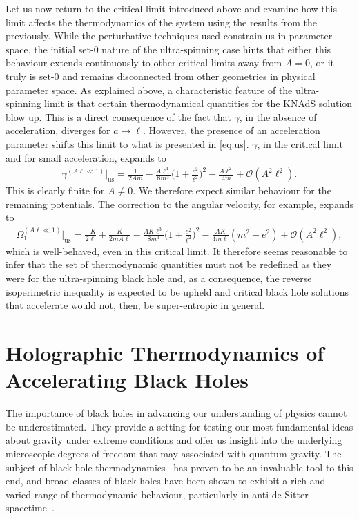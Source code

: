 \documentclass[
twoside,
openright,
frontopenright,
]{dmathesis}
\begin{document}
Let us now return to the critical limit introduced above and examine how this
limit affects the thermodynamics of the system using the results from the
previously. While the perturbative techniques used constrain us in parameter
space, the initial set-0 nature of the ultra-spinning case hints that either
this behaviour extends continuously to other critical limits away from $A=0$, or
it truly is set-0 and remains disconnected from other geometries in physical
parameter space. As explained above, a characteristic feature of the
ultra-spinning limit is that certain thermodynamical quantities for the KNAdS
solution blow up. This is a direct consequence of the fact that $\gamma$, in the
absence of acceleration, diverges for $a\to\ell$. However, the presence of an
acceleration parameter shifts this limit to what is presented in
\cref{eq:us}. $\gamma$, in the critical limit and for small acceleration,
expands to
\begin{align}
\gamma^{(A\ell\ll 1)}\Big|_{\mathrm{us}}=\frac{1}{2Am} - \frac{A\ell^4}{8m^3}\Big(1+\frac{e^2}{\ell^2}\Big)^2-\frac{A\ell^2}{4m}+\mathcal{O}(A^2\ell^2).
\end{align}
This is clearly finite for $A\neq 0$. We therefore expect similar behaviour for
the remaining potentials. The correction to the angular velocity, for example,
expands to
\begin{align}
\Omega_1^{(A\ell\ll 1)}\Big|_{\mathrm{us}} = \frac{-K}{2\ell}+\frac{K}{2mA\ell}-\frac{A K\ell^3}{8m^3}\Big(1+\frac{e^2}{\ell^2}\Big)^2-\frac{A K}{4 m\ell}(m^2-e^2)+\mathcal{O}(A^2\ell^2),
\end{align}
which is well-behaved, even in this critical limit. It therefore seems
reasonable to infer that the set of thermodynamic quantities must not be
redefined as they were for the ultra-spinning black hole and, as a consequence,
the reverse isoperimetric inequality is expected to be upheld and critical black
hole solutions that accelerate would not, then, be super-entropic in general.

\chapter{Holographic Thermodynamics of Accelerating Black Holes}
\label{chap:holoTD}

The importance of black holes in advancing our understanding of physics cannot
be underestimated.  They provide a setting for testing our most fundamental
ideas about gravity under extreme conditions and offer us insight into the
underlying microscopic degrees of freedom that may associated with quantum
gravity.  The subject of black hole thermodynamics~\cite{Bekenstein:1973ur,
  Bekenstein:1974ax,Hawking:1974sw} has proven to be an invaluable tool to this
end, and broad classes of black holes have been shown to exhibit a rich and
varied range of thermodynamic behaviour, particularly in anti-de Sitter
spacetime~\cite{Kubiznak:2016qmn}.
\end{document}
